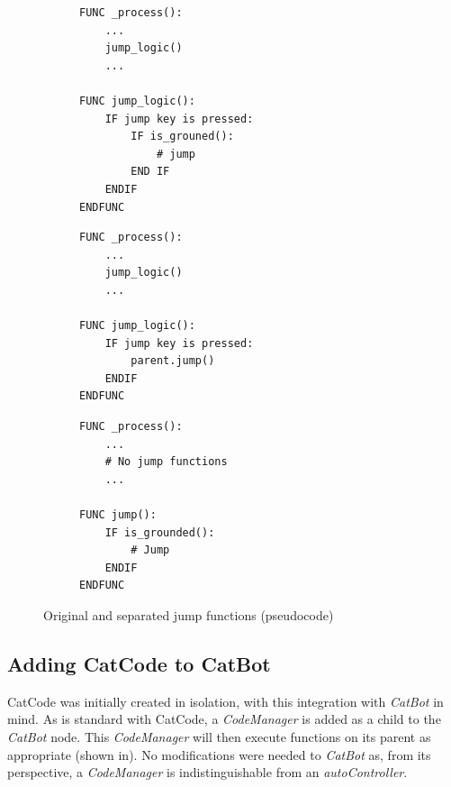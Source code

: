 \begin{figure}[h]
    \centering
    \begin{subfigure}[t]{0.55\linewidth}
        \begin{tcolorbox}[boxrule=0.25mm]
            \begin{verbatim}
FUNC _process():
    ...
    jump_logic()
    ...

FUNC jump_logic():
    IF jump key is pressed:
        IF is_grouned():
            # jump
        END IF
    ENDIF
ENDFUNC
            \end{verbatim}
        \end{tcolorbox}
    \end{subfigure}
    \begin{subfigure}[t]{0.45\linewidth}
        \begin{tcolorbox}[boxrule=0.25mm]
            \begin{verbatim}
FUNC _process():
    ...
    jump_logic()
    ...

FUNC jump_logic():
    IF jump key is pressed:
        parent.jump()
    ENDIF
ENDFUNC
            \end{verbatim}
        \end{tcolorbox}
    \end{subfigure}
    \begin{subfigure}[t]{0.45\linewidth}
        \begin{tcolorbox}[boxrule=0.25mm]
            \begin{verbatim}
FUNC _process():
    ...
    # No jump functions
    ...

FUNC jump():
    IF is_grounded():
        # Jump
    ENDIF
ENDFUNC
            \end{verbatim}
        \end{tcolorbox}
    \end{subfigure}
    \caption{Original and separated jump functions (pseudocode)}
    \label{fig:design/catBot-ModularisedFun}
\end{figure}

\subsection{Adding CatCode to CatBot}\label{sec:design/CatBot/instancing}

CatCode was initially created in isolation, with this integration with \textit{CatBot} in mind. As is standard with CatCode, a \textit{CodeManager} is added as a child to the \textit{CatBot} node. This \textit{CodeManager} will then execute functions on its parent as appropriate (shown in). No modifications were needed to \textit{CatBot} as, from its perspective, a \textit{CodeManager} is indistinguishable from an \textit{autoController}.

